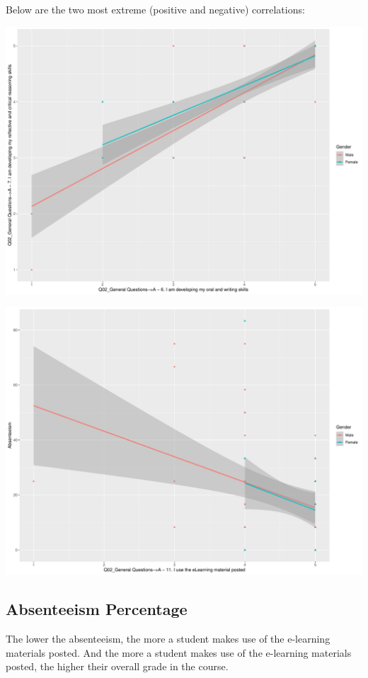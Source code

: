 \documentclass[
]{article}
\begin{document}
Below are the two most extreme (positive and negative) correlations:

\includegraphics{AnalysisOfCourseEvaluation-Notebook_files/figure-latex/DrillDownCorr1-1.pdf}

\includegraphics{AnalysisOfCourseEvaluation-Notebook_files/figure-latex/DrillDownCorr2-1.pdf}

\newpage

\subsection{Absenteeism Percentage}\label{absenteeism-percentage}

The lower the absenteeism, the more a student makes use of the
e-learning materials posted. And the more a student makes use of the
e-learning materials posted, the higher their overall grade in the
course.
\end{document}
